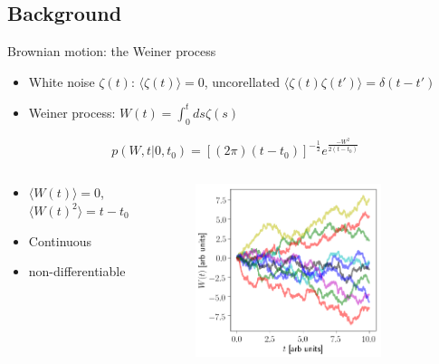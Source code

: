 \documentclass[]{beamer}
\newcommand {\be}{\begin{equation*}}
\newcommand {\ee}{\end{equation*}}
\newcommand{\expect}[1]{\langle#1\rangle}
\begin{document}
\subsection{Background}
\begin{frame}{Brownian motion: the Weiner process}
\begin{itemize}
  \setlength\itemsep{0.5em}
 \item White noise $\zeta(t)$: $\expect{\zeta(t)}=0$, uncorellated $\expect{\zeta(t)\zeta(t')}=\delta(t-t')$
\item Weiner process: $W(t)=\int_0^t ds \zeta(s)$
\end{itemize}

\be
p(W, t| 0, t_0)=[(2\pi)(t-t_0)]^{-\frac{1}{2}}e^{\frac{-W^2}{2(t-t_0)}} \label{eq:pwien}
\ee
\begin{columns}
\begin{column}{0.475\textwidth}
\begin{itemize}
 \item $\expect{{W}(t)}=0$,  $\expect{W(t)^2}=t-t_0$
\item Continuous
\item non-differentiable
\end{itemize}
\end{column}
\begin{column}{0.475\textwidth}
\begin{figure}[t]
\vspace{-20pt}
\captionsetup[figure]{labelformat=empty}
\includegraphics[width=0.8\textwidth]{Weiner.png}
\end{figure}
\end{column}
\end{columns}
\end{frame}
\end{document}
